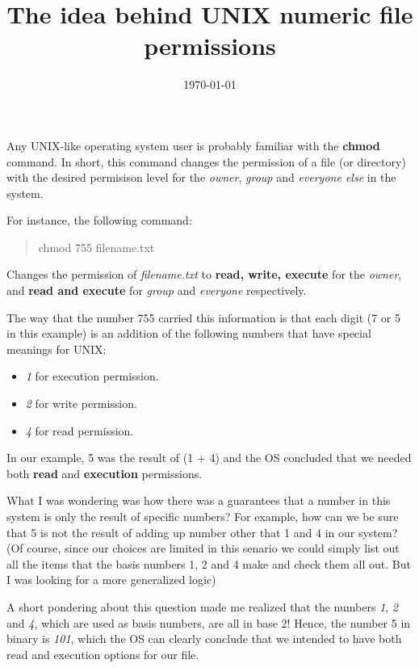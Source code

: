 \documentclass[11pt]{article}
\date{\today}
\title{The idea behind UNIX numeric file permissions}
\begin{document}
\maketitle
\tableofcontents

Any UNIX-like operating system user is probably familiar with the \textbf{chmod} command.
In short, this command changes the permission of a file (or directory) with the desired permisison level for the \emph{owner}, \emph{group} and \emph{everyone else} in the system.

For instance, the following command:

\begin{quote}
chmod 755 filename.txt
\end{quote}

Changes the permission of \emph{filename.txt} to \textbf{read, write, execute} for the \emph{owner}, and \textbf{read and execute} for \emph{group} and \emph{everyone} respectively.

The way that the number 755 carried this information is that each digit (7 or 5 in this example) is an addition of the following numbers that have special meanings for UNIX:

\begin{itemize}
\item \emph{1} for execution permission.
\item \emph{2} for write permission.
\item \emph{4} for read permission.
\end{itemize}

In our example, 5 was the result of (1 + 4) and the OS concluded that we needed both \textbf{read} and \textbf{execution} permissions.

What I was wondering was how there was a guarantees that a number in this system is only the result of specific numbers?
For example, how can we be sure that 5 is not the result of adding up number other that 1 and 4 in our system?
(Of course, since our choices are limited in this senario we could simply list out all the items that the basis numbers 1, 2 and 4 make and check them all out. But I was looking for a more generalized logic)

A short pondering about this question made me realized that the numbers \emph{1}, \emph{2} and \emph{4}, which are used as basis numbers, are all in base 2!
Hence, the number 5 in binary is \emph{101}, which the OS can clearly conclude that we intended to have both read and execution options for our file.
\end{document}
